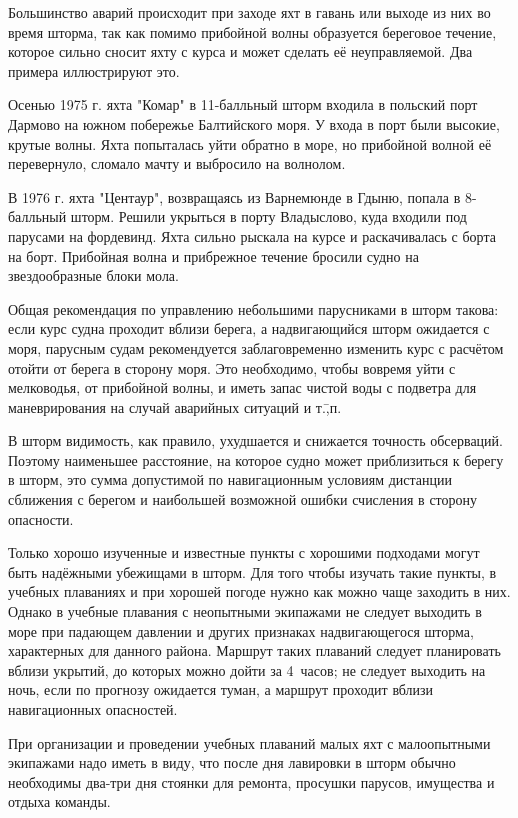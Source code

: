 Большинство аварий происходит при заходе яхт в гавань или выходе из них во время шторма, так как помимо прибойной волны образуется береговое течение, которое сильно сносит яхту с курса и может сделать её неуправляемой. Два примера иллюстрируют это.

{\small Осенью 1975 г. яхта "Комар" в 11-балльный шторм входила в польский порт Дармово на южном побережье Балтийского моря. У входа в порт были высокие, крутые волны. Яхта попыталась уйти обратно в море, но прибойной волной её перевернуло, сломало мачту и выбросило на волнолом.

В 1976 г. яхта "Центаур", возвращаясь из Варнемюнде в Гдыню, попала в 8-балльный шторм. Решили укрыться в порту Владыслово, куда входили под парусами на фордевинд. Яхта сильно рыскала на курсе и раскачивалась с борта на борт. Прибойная волна и прибрежное течение бросили судно на звездообразные блоки мола.}

Общая рекомендация по управлению небольшими парусниками в шторм такова: если курс судна проходит вблизи берега, а надвигающийся шторм ожидается с моря, парусным судам рекомендуется заблаговременно изменить курс с расчётом отойти от берега в сторону моря. Это необходимо, чтобы вовремя уйти с мелководья, от прибойной волны, и иметь запас чистой воды с подветра для маневрирования на случай аварийных ситуаций и т.\=,п. 

В шторм видимость, как правило, ухудшается и снижается точность обсерваций. Поэтому наименьшее расстояние, на которое судно может приблизиться к берегу в шторм, это сумма допустимой по навигационным условиям дистанции сближения с берегом и наибольшей возможной ошибки счисления в сторону опасности. 

Только хорошо изученные и известные пункты с хорошими подходами могут быть надёжными убежищами в шторм. Для того чтобы изучать такие пункты, в учебных плаваниях и при хорошей погоде нужно как можно чаще заходить в них. Однако в учебные плавания с неопытными экипажами не следует выходить в море при падающем давлении и других признаках надвигающегося шторма, характерных для данного района. Маршрут таких плаваний следует планировать вблизи укрытий, до которых можно дойти за 4~часов; не следует выходить на ночь, если по прогнозу ожидается туман, а маршрут проходит вблизи навигационных опасностей. 

При организации и проведении учебных плаваний малых яхт с малоопытными экипажами надо иметь в виду, что после дня лавировки в шторм обычно необходимы два-три дня стоянки для ремонта, просушки парусов, имущества и отдыха команды. 

